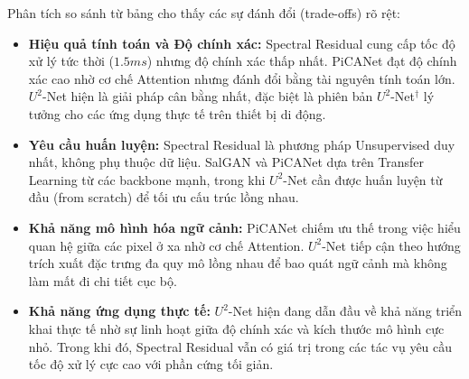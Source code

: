 Phân tích so sánh từ bảng cho thấy các sự đánh đổi (trade-offs) rõ rệt:
\begin{itemize}
    \item \textbf{Hiệu quả tính toán và Độ chính xác:} Spectral Residual cung cấp tốc độ xử lý tức thời ($1.5ms$) nhưng độ chính xác thấp nhất. PiCANet đạt độ chính xác cao nhờ cơ chế Attention nhưng đánh đổi bằng tài nguyên tính toán lớn. $U^2$-Net hiện là giải pháp cân bằng nhất, đặc biệt là phiên bản $U^2$-Net$^\dagger$ lý tưởng cho các ứng dụng thực tế trên thiết bị di động.
    \item \textbf{Yêu cầu huấn luyện:} Spectral Residual là phương pháp Unsupervised duy nhất, không phụ thuộc dữ liệu. SalGAN và PiCANet dựa trên Transfer Learning từ các backbone mạnh, trong khi $U^2$-Net cần được huấn luyện từ đầu (from scratch) để tối ưu cấu trúc lồng nhau.
    \item \textbf{Khả năng mô hình hóa ngữ cảnh:} PiCANet chiếm ưu thế trong việc hiểu quan hệ giữa các pixel ở xa nhờ cơ chế Attention. $U^2$-Net tiếp cận theo hướng trích xuất đặc trưng đa quy mô lồng nhau để bao quát ngữ cảnh mà không làm mất đi chi tiết cục bộ.
    \item \textbf{Khả năng ứng dụng thực tế:} $U^2$-Net hiện đang dẫn đầu về khả năng triển khai thực tế nhờ sự linh hoạt giữa độ chính xác và kích thước mô hình cực nhỏ. Trong khi đó, Spectral Residual vẫn có giá trị trong các tác vụ yêu cầu tốc độ xử lý cực cao với phần cứng tối giản.
\end{itemize}